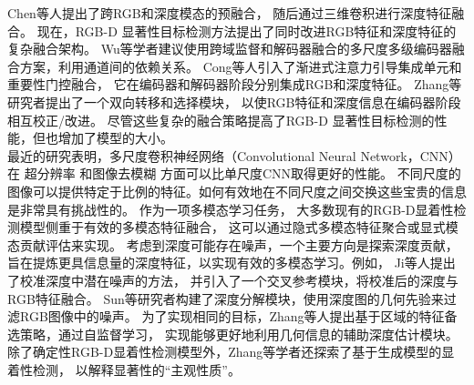 Chen等人提出了跨RGB和深度模态的预融合，
随后通过三维卷积进行深度特征融合。
现在，RGB-D 显著性目标检测方法提出了同时改进RGB特征和深度特征的复杂融合架构。
Wu等学者建议使用跨域监督和解码器融合的多尺度多级编码器融合方案，利用通道间的依赖关系。
Cong等人引入了渐进式注意力引导集成单元和重要性门控融合，
它在编码器和解码器阶段分别集成RGB和深度特征。
Zhang等研究者提出了一个双向转移和选择模块，
以使RGB特征和深度信息在编码器阶段相互校正/改进。
尽管这些复杂的融合策略提高了RGB-D 显著性目标检测的性能，但也增加了模型的大小。
\\
%
%
%
%
\indent
最近的研究表明，多尺度卷积神经网络（Convolutional Neural Network，CNN）在
超分辨率
和图像去模糊
方面可以比单尺度CNN取得更好的性能。
不同尺度的图像可以提供特定于比例的特征。如何有效地在不同尺度之间交换这些宝贵的信息是非常具有挑战性的。
作为一项多模态学习任务，
大多数现有的RGB-D显着性检测模型侧重于有效的多模态特征融合，
这可以通过隐式多模态特征聚合或显式模态贡献评估来实现。
考虑到深度可能存在噪声，一个主要方向是探索深度贡献，
旨在提炼更具信息量的深度特征，以实现有效的多模态学习。例如，
Ji等人提出了校准深度中潜在噪声的方法，
并引入了一个交叉参考模块，将校准后的深度与RGB特征融合。
Sun等研究者构建了深度分解模块，使用深度图的几何先验来过滤RGB图像中的噪声。
为了实现相同的目标，Zhang等人提出基于区域的特征备选策略，通过自监督学习，
实现能够更好地利用几何信息的辅助深度估计模块。
除了确定性RGB-D显着性检测模型外，Zhang等学者还探索了基于生成模型的显着性检测，
以解释显著性的“主观性质”。
